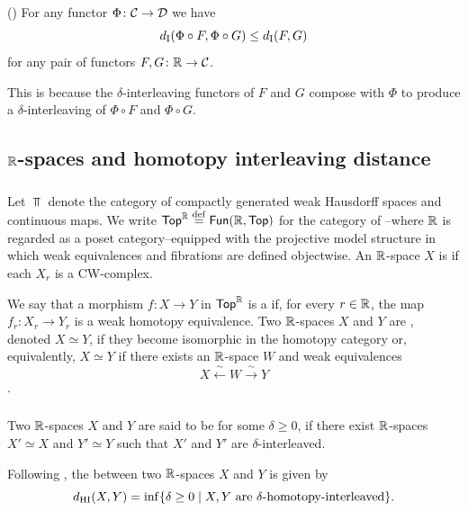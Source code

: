 \proposition (\cite[page~1508]{bubenik2015metrics})
For any functor $\Phi \colon \mathcal{C} \to \mathcal{D}$ we have
\[
d_{\mathrm{I}}(\Phi \circ F, \Phi \circ G) \leq d_{\mathrm{I}}(F, G)
\]
for any pair of functors $F, G \colon \mathbb{R} \to \mathcal{C}$.

\medskip\noindent
This is because the $\delta$-interleaving functors of $F$ and $G$ compose with $\Phi$ to produce a $\delta$-interleaving of $\Phi \circ F$ and $\Phi \circ G$.

\subsection{$\mathbb{R}$-spaces and homotopy interleaving distance}

\subsubsection{}\label{ss:R-spaces}

Let $\Top$ denote the category of compactly generated weak Hausdorff spaces and continuous maps.
We write $\mathsf{Top}^{\mathbb{R}} \stackrel{\mathrm{def}}{=} \mathsf{Fun}(\mathbb{R},\mathsf{Top})$ for the category of --where $\mathbb{R}$ is regarded as a poset category--equipped with the projective model structure in which weak equivalences and fibrations are defined objectwise.
An $\mathbb{R}$-space $X$ is  if each $X_r$ is a CW-complex.

We say that a morphism $f \colon X \to Y$ in $\mathsf{Top}^{\mathbb{R}}$ is a  if, for every $r \in \mathbb{R}$, the map $f_r \colon X_r \to Y_r$ is a weak homotopy equivalence.
Two $\mathbb{R}$-spaces $X$ and $Y$ are , denoted $X \simeq Y$, if they become isomorphic in the homotopy category or, equivalently, $X \simeq Y$ if there exists an $\mathbb{R}$-space $W$ and weak equivalences
\[
X \xleftarrow{\ \sim\ } W \xrightarrow{\ \sim\ } Y
\]
\cite[\S2.4]{blumberg2023interleaving}.

\subsubsection{}\label{def:dhi}

Two $\mathbb{R}$-spaces $X$ and $Y$ are said to be  for some $\delta \geq 0$, if there exist $\mathbb{R}$-spaces $X' \simeq X$ and $Y' \simeq Y$ such that $X'$ and $Y'$ are $\delta$-interleaved.

Following \cite{blumberg2023interleaving}, the  between two $\mathbb{R}$-spaces $X$ and $Y$ is given by
\[
d_{\mathrm{HI}}(X,Y) = \inf \{\delta \geq 0 \mid X,Y \text{ are }\delta\text{-homotopy-interleaved}\}.
\]

